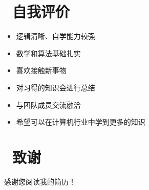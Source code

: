 \documentclass{resume}
\begin{document}
\section{\faTags\ 自我评价}
\begin{itemize}[parsep=0.5ex]
  \item 逻辑清晰、自学能力较强
  \item 数学和算法基础扎实
  \item 喜欢接触新事物
  \item 对习得的知识会进行总结
  \item 与团队成员交流融洽
  \item 希望可以在计算机行业中学到更多的知识
\end{itemize}

\section{\faHeartO\ 致谢}
感谢您阅读我的简历！

%
%
\end{document}
